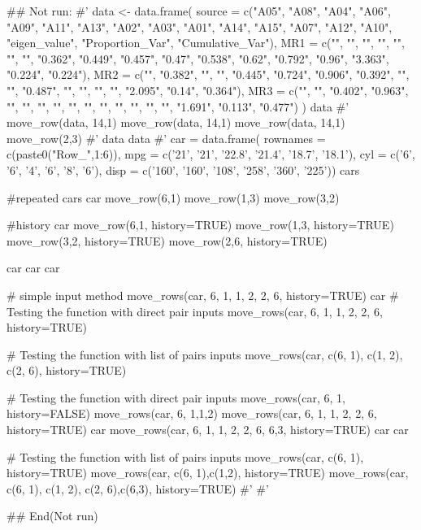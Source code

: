 \documentclass[a4paper]{book}
\begin{document}
\begin{Examples}
\begin{ExampleCode}

## Not run: 
#'
data <- data.frame(
  source = c("A05", "A08", "A04", "A06",
  "A09", "A11", "A13", "A02", "A03", "A01",
  "A14", "A15", "A07", "A12", "A10",
  "eigen_value", "Proportion_Var", "Cumulative_Var"),
  MR1 = c("", "", "", "", "", "", "",
  "0.362", "0.449", "0.457", "0.47",
  "0.538", "0.62", "0.792", "0.96",
  "3.363", "0.224", "0.224"),
  MR2 = c("", "0.382", "", "", "0.445",
  "0.724", "0.906", "0.392", "", "",
  "0.487", "", "", "", "", "2.095",
   "0.14", "0.364"),
  MR3 = c("", "", "0.402", "0.963", "", "",
   "", "", "", "", "", "", "", "",
    "", "1.691", "0.113", "0.477")
)
data
#'
move_row(data, 14,1)
move_row(data, 14,1)%
move_row(data, 14,1)%
 move_row(2,3)
#'
data %
data %
#'
car = data.frame(
  rownames = c(paste0("Row_",1:6)),
  mpg = c('21', '21', '22.8', '21.4', '18.7', '18.1'),
  cyl = c('6', '6', '4', '6', '8', '6'),
  disp = c('160', '160', '108', '258', '360', '225'))
cars

#repeated
cars
car %
  move_row(6,1)%
  move_row(1,3)%
  move_row(3,2)

#history
car %
  move_row(6,1, history=TRUE)%
  move_row(1,3, history=TRUE)%
  move_row(3,2, history=TRUE)%
  move_row(2,6, history=TRUE)

car%
car%
car%

# simple input method
move_rows(car, 6, 1, 1, 2, 2, 6, history=TRUE)
car%
# Testing the function with direct pair inputs
move_rows(car, 6, 1, 1, 2, 2, 6, history=TRUE)

# Testing the function with list of pairs inputs
move_rows(car, c(6, 1), c(1, 2), c(2, 6), history=TRUE)


# Testing the function with direct pair inputs
move_rows(car, 6, 1,  history=FALSE)
move_rows(car, 6, 1,1,2)
move_rows(car, 6, 1, 1, 2, 2, 6, history=TRUE)
car%
move_rows(car, 6, 1, 1, 2, 2, 6, 6,3, history=TRUE)
car%
car%


# Testing the function with list of pairs inputs
move_rows(car, c(6, 1), history=TRUE)
move_rows(car, c(6, 1),c(1,2), history=TRUE)
move_rows(car, c(6, 1), c(1, 2), c(2, 6),c(6,3), history=TRUE)
#'
#'




## End(Not run)

\end{ExampleCode}
\end{Examples}
\end{document}
